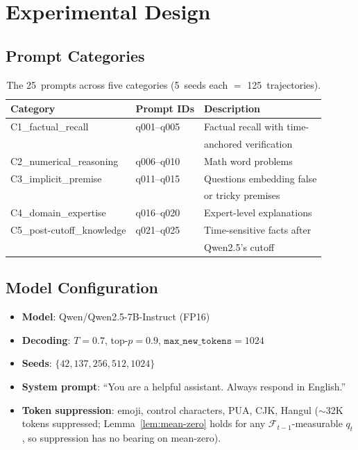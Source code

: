 \documentclass[runningheads]{llncs}
\begin{document}
\section{Experimental Design}

\subsection{Prompt Categories}

\begin{table}[ht]
\centering
\caption{The 25~prompts across five categories
         (5~seeds each $=$ 125~trajectories).}
\label{tab:prompts}
\begin{tabular}{lll}
\hline
Category & Prompt IDs & Description \\
\hline
C1\_factual\_recall          & q001--q005 & Factual recall with time- \\
                             &             & \quad anchored verification \\
C2\_numerical\_reasoning      & q006--q010 & Math word problems \\
C3\_implicit\_premise          & q011--q015 & Questions embedding false \\
                             &             & \quad or tricky premises \\
C4\_domain\_expertise          & q016--q020 & Expert-level explanations \\
C5\_post-cutoff\_knowledge     & q021--q025 & Time-sensitive facts after \\
                             &             & \quad Qwen2.5's cutoff \\
\hline
\end{tabular}
\end{table}

\subsection{Model Configuration}
\begin{itemize}
    \item \textbf{Model}: Qwen/Qwen2.5-7B-Instruct (FP16)
    \item \textbf{Decoding}: $T = 0.7$, top-$p = 0.9$,
          $\texttt{max\_new\_tokens} = 1024$
    \item \textbf{Seeds}: $\{42, 137, 256, 512, 1024\}$
    \item \textbf{System prompt}: ``You are a helpful assistant.
          Always respond in English.''
    \item \textbf{Token suppression}: emoji, control characters, PUA, CJK,
          Hangul ($\sim$32K tokens suppressed; Lemma~\ref{lem:mean-zero}
          holds for any $\mathcal{F}_{t-1}$-measurable $q_t$, so suppression
          has no bearing on mean-zero).
\end{itemize}
\end{document}
